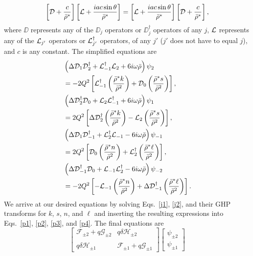 \begin{refsection}
\begin{align}
\left[\mathcal{D}+\frac{c}{\bar{\rho}^*}\right]\left[\mathcal{L}+\frac{iac\sin\theta}{\bar{\rho}^*}\right]=\left[\mathcal{L}+\frac{iac\sin\theta}{\bar{\rho}^*}\right]\left[\mathcal{D}+\frac{c}{\bar{\rho}^*}\right], \label{mcrel}
\end{align}
where $\DD$ represents any of the $\DD_j$ operators or $\DD^\dagger_j$ operators of any $j$, $\mathcal{L}$ represents any of the $\mathcal{L}_{j'}$ operators or $\mathcal{L}^\dagger_{j'}$ operators, of any $j'$ ($j'$ does not have to equal $j$), and $c$ is any constant. The simplified equations are
\begin{align}
&\left(\Delta\mathcal{D}_1\mathcal{D}_2^\dagger+\mathcal{L}_{-1}^\dagger\mathcal{L}_2+6i\omega\bar{\rho}\right)\psi_2 \nonumber \\
&=-2Q^2\left[\mathcal{L}_{-1}^\dagger\left(\frac{\bar{\rho}^*k}{\bar{\rho}^2}\right)+\mathcal{D}_0\left(\frac{\bar{\rho}^*s}{\bar{\rho}^2}\right)\right], \label{p1}
\\ & \left(\Delta\mathcal{D}_2^\dagger\mathcal{D}_0+\mathcal{L}_2\mathcal{L}_{-1}^\dagger+6i\omega\bar{\rho}\right)\psi_1 \nonumber 
\\ &=2Q^2\left[\Delta\mathcal{D}_2^\dagger\left(\frac{\bar{\rho}^*k}{\bar{\rho}^2}\right)-\mathcal{L}_2\left(\frac{\bar{\rho}^*s}{\bar{\rho}^2}\right)\right], \label{p2}
\\& \left(\Delta\mathcal{D}_1\mathcal{D}_{-1}^\dagger+\mathcal{L}_2^\dagger\mathcal{L}_{-1}-6i\omega\bar{\rho}\right)\psi_{-1} \nonumber \\
&= 2Q^2\left[\mathcal{D}_0\left(\frac{\bar{\rho}^* n}{\bar{\rho}^2}\right)+\mathcal{L}_2^\dagger\left(\frac{\bar{\rho}^*\ell}{\bar{\rho}^2}\right)\right], \label{p3}
\\& \left(\Delta\mathcal{D}_{-1}^\dagger\mathcal{D}_0+\mathcal{L}_{-1}\mathcal{L}_2^\dagger-6i\omega\bar{\rho}\right)\psi_{-2} \nonumber \\
&= -2Q^2\left[-\mathcal{L}_{-1}\left(\frac{\bar{\rho}^* n}{\bar{\rho}^2}\right)+\Delta\mathcal{D}_{-1}^\dagger\left(\frac{\bar{\rho}^* \ell}{\bar{\rho}^2}\right)\right]. \label{p4}
\end{align}
We arrive at our desired equations by solving Eqs.~\eqref{j1}, \eqref{j2}, and their GHP transforms for $k$, $s$, $n$, and $\ell$ and inserting the resulting expressions into Eqs.~\eqref{p1}, \eqref{p2}, \eqref{p3}, and \eqref{p4}. The final equations are
\begin{equation}
\begin{bmatrix}
\mathcal{F}_{\pm2}+ q\mathcal{G}_{\pm2}  & q\delta \mathcal{H}_{\pm2} \\ \\
q \delta \mathcal{H}_{\pm1} &  \mathcal{F}_{\pm1} +q\mathcal{G}_{\pm1}
\end{bmatrix}
\begin{bmatrix}
\psi_{\pm2} \\
\psi_{\pm1}
\end{bmatrix}

\end{equation}
\end{refsection}
